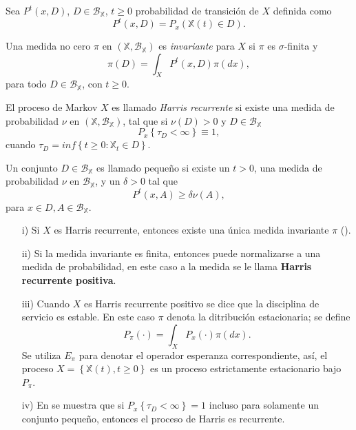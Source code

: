 Sea $P^{t}\left(x,D\right)$, $D\in\mathcal{B}_{\mathbb{X}}$,
$t\geq0$ probabilidad de transici\'on de $X$ definida como
\[P^{t}\left(x,D\right)=P_{x}\left(\mathbb{X}\left(t\right)\in
D\right).\]

\begin{Def}
Una medida no cero $\pi$ en
$\left(\mathbb{X},\mathcal{B}_{\mathbb{X}}\right)$ es {\em
invariante} para $X$ si $\pi$ es $\sigma$-finita y
\[\pi\left(D\right)=\int_{X}P^{t}\left(x,D\right)\pi\left(dx\right),\]
para todo $D\in \mathcal{B}_{\mathbb{X}}$, con $t\geq0$.
\end{Def}

\begin{Def}
El proceso de Markov $X$ es llamado {\em Harris recurrente} si
existe una medida de probabilidad $\nu$ en
$\left(\mathbb{X},\mathcal{B}_{\mathbb{X}}\right)$, tal que si
$\nu\left(D\right)>0$ y $D\in\mathcal{B}_{\mathbb{X}}$
\[P_{x}\left\{\tau_{D}<\infty\right\}\equiv1,\] cuando
$\tau_{D}=inf\left\{t\geq0:\mathbb{X}_{t}\in D\right\}$.
\end{Def}

\begin{Def}
Un conjunto $D\in\mathcal{B}_\mathbb{X}$ es llamado peque\~no si
existe un $t>0$, una medida de probabilidad $\nu$ en
$\mathcal{B}_\mathbb{X}$, y un $\delta>0$ tal que
\[P^{t}\left(x,A\right)\geq\delta\nu\left(A\right),\] para $x\in
D,A\in\mathcal{B}_\mathbb{X}$.
\end{Def}
\begin{Note}
\begin{itemize}

\item[i)] Si $X$ es Harris recurrente, entonces existe una \'unica medida
invariante $\pi$ (\cite{Getoor}).

\item[ii)] Si la medida invariante es finita, entonces puede
normalizarse a una medida de probabilidad, en este caso a la
medida se le llama \textbf{Harris recurrente positiva}.

\item[iii)] Cuando $X$ es Harris recurrente positivo se dice que
la disciplina de servicio es estable. En este caso $\pi$ denota la
ditribuci\'on estacionaria; se define
\[P_{\pi}\left(\cdot\right)=\int_{X}P_{x}\left(\cdot\right)\pi\left(dx\right).\]
Se utiliza $E_{\pi}$ para denotar el operador esperanza
correspondiente, as\'i, el proceso
$X=\left\{\mathbb{X}\left(t\right),t\geq0\right\}$ es un proceso
estrictamente estacionario bajo $P_{\pi}$.

\item[iv)] En \cite{MeynTweedie} se muestra que si
$P_{x}\left\{\tau_{D}<\infty\right\}=1$ incluso para solamente un
conjunto peque\~no, entonces el proceso de Harris es recurrente.
\end{itemize}
\end{Note}

